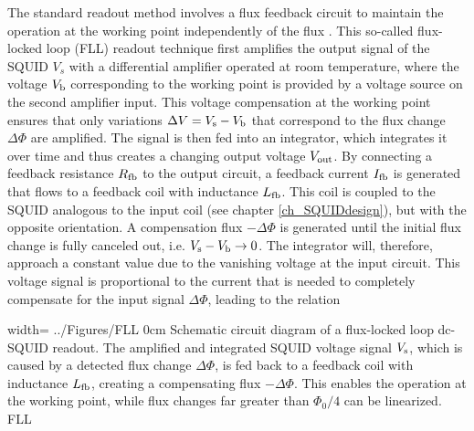 The standard readout method involves a flux feedback circuit to maintain the operation at the working point independently of the flux \cite{Drung2002}. This so-called flux-locked loop (FLL) readout technique first amplifies the output signal of the SQUID $V_s$ with a differential amplifier operated at room temperature, where the voltage $V_{\rm b}$ corresponding to the working point is provided by a voltage source on the second amplifier input. This voltage compensation at the working point ensures that only variations $\Delta V = V_{\rm s}-V_{\rm b}$ that correspond to the flux change $\Delta\Phi$ are amplified. The signal is then fed into an integrator, which integrates it over time and thus creates a changing output voltage $V_{\rm out}$. By connecting a feedback resistance $R_{\rm fb}$ to the output circuit, a feedback current $I_{\rm fb}$ is generated that flows to a feedback coil with inductance $L_{\rm fb}$. This coil is coupled to the SQUID analogous to the input coil (see chapter \ref{ch_SQUIDdesign}), but with the opposite orientation. A compensation flux $-\Delta\Phi$ is generated until the initial flux change is fully canceled out, i.e. $V_{\rm s}-V_{\rm b}\to 0$. The integrator will, therefore, approach a constant value due to the vanishing voltage at the input circuit. This voltage signal is proportional to the current that is needed to completely compensate for the input signal $\Delta\Phi$, leading to the relation 


{width=\textwidth}
{../Figures/FLL}
{0cm}
{Schematic circuit diagram of a flux-locked loop dc-SQUID readout. The amplified and integrated SQUID voltage signal $V_{\rm s}$, which is caused by a detected flux change $\Delta\Phi$, is fed back to a feedback coil with inductance $L_{\rm fb}$, creating a compensating flux $-\Delta\Phi$. This enables the operation at the working point, while flux changes far greater than $\Phi_0/4$ can be linearized.} 
{FLL}


